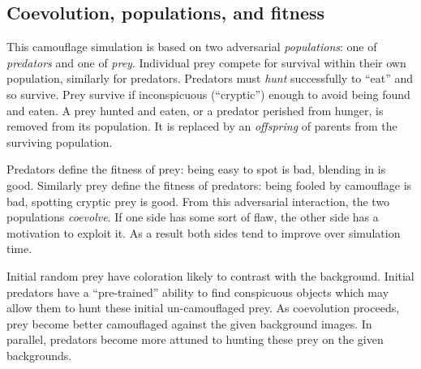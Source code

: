 \documentclass[sigconf]{acmart}
\newcommand{\jargon}[1]{\textit{#1}}
\begin{document}
\subsection{Coevolution, populations, and fitness}
This camouflage simulation is based on two adversarial \jargon{populations}: one of \jargon{predators} and one of \jargon{prey}. Individual prey compete for survival within their own population, similarly for predators. Predators must \jargon{hunt} successfully to “eat” and so survive. Prey survive if inconspicuous (“cryptic”) enough to avoid being found and eaten. A prey hunted and eaten, or a predator perished from hunger, is removed from its population. It is replaced by an \jargon{offspring} of parents from the surviving population.
\par
Predators define the fitness of prey: being easy to spot is bad, blending in is good. Similarly prey define the fitness of predators: being fooled by camouflage is bad, spotting cryptic prey is good. From this adversarial interaction, the two populations \jargon{coevolve}. If one side has some sort of flaw, the other side has a motivation to exploit it. As a result both sides tend to improve over simulation time.
\par
Initial random prey have coloration likely to contrast with the background. Initial predators have a “pre-trained” ability to find conspicuous objects which may allow them to hunt these initial un-camouflaged prey. As coevolution proceeds, prey become better camouflaged against the given background images. In parallel, predators become more attuned to hunting these prey on the given backgrounds.
\par

\end{document}
